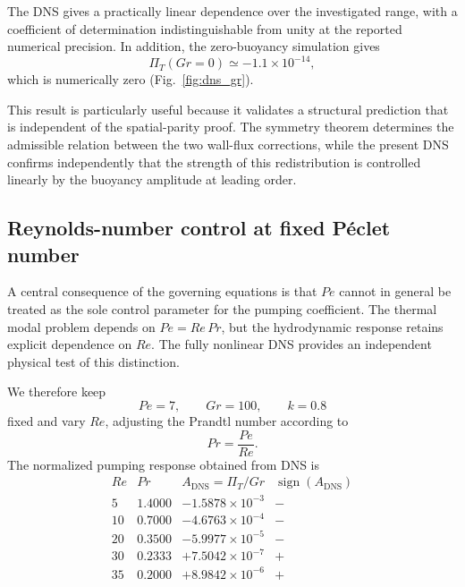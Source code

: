 \documentclass[12pt,a4paper]{article}
\newcommand{\Rey}{\mathit{Re}}
\newcommand{\Pe}{\mathit{Pe}}
\newcommand{\Grr}{\mathit{Gr}}
\renewcommand{\Pr}{\mathit{Pr}}
\newcommand{\PiT}{\Pi_T}
\begin{document}
The DNS gives a practically linear dependence over the investigated range,
with a coefficient of determination indistinguishable from unity at the
reported numerical precision. In addition, the zero-buoyancy simulation gives
\begin{equation}
\PiT(\Grr=0)
\simeq -1.1\times10^{-14},
\end{equation}
which is numerically zero (Fig.~\ref{fig:dns_gr}).

This result is particularly useful because it validates a structural
prediction that is independent of the spatial-parity proof. The symmetry
theorem determines the admissible relation between the two wall-flux
corrections, while the present DNS confirms independently that the strength
of this redistribution is controlled linearly by the buoyancy amplitude at
leading order.

\subsection{Reynolds-number control at fixed P\'eclet number}
\label{subsec:dns_re}

A central consequence of the governing equations is that $\Pe$ cannot in
general be treated as the sole control parameter for the pumping coefficient.
The thermal modal problem depends on $\Pe=\Rey\,\Pr$, but the hydrodynamic response
retains explicit dependence on $\Rey$. The fully nonlinear DNS provides an
independent physical test of this distinction.

We therefore keep
\begin{equation}
\Pe=7,\qquad \Grr=100,\qquad k=0.8
\end{equation}
fixed and vary $\Rey$, adjusting the Prandtl number according to
\begin{equation}
\Pr=\frac{\Pe}{\Rey}.
\end{equation}
The normalized pumping response obtained from DNS is
\begin{equation}
\begin{array}{c|c|c|c}
\Rey & \Pr & A_{\mathrm{DNS}}=\PiT/\Grr & \operatorname{sign}(A_{\mathrm{DNS}})\\
\hline
5
& 1.4000
& -1.5878\times10^{-3}
& -\\
10
& 0.7000
& -4.6763\times10^{-4}
& -\\
20
& 0.3500
& -5.9977\times10^{-5}
& -\\
30
& 0.2333
& +7.5042\times10^{-7}
& +\\
35
& 0.2000
& +8.9842\times10^{-6}
& +
\end{array}
\end{equation}
\end{document}
